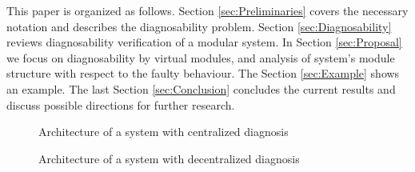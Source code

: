 \documentclass[letterpaper, 10pt, conference]{ieeeconf}
\begin{document}
This paper is organized as follows. Section \ref{sec:Preliminaries} covers the
necessary notation and describes the diagnosability problem. Section
\ref{sec:Diagnosability} reviews diagnosability verification of a modular
system. In Section \ref{sec:Proposal} we focus on diagnosability by virtual
modules, and analysis of system's module structure with respect to the faulty
behaviour. The Section \ref{sec:Example} shows an example. The last Section
\ref{sec:Conclusion} concludes the current results and discuss possible
directions for further research.


\begin{figure}[t]
\centering
{}
\caption{Architecture of a system with centralized diagnosis}
\label{fig_centralized}
\end{figure}

\begin{figure}[t]
\centering
{}
\caption{Architecture of a system with decentralized diagnosis}
\label{fig_decentralized}
\end{figure}
\end{document}
